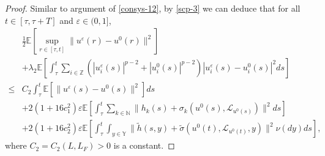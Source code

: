 \documentclass[11pt]{article}
\numberwithin{equation}{section}
\theoremstyle{plain}
\begin{document}
\begin{proof}
  Similar to argument of \eqref{consys-12},
  by \eqref{scp-3} we can deduce that for all $t \in [\tau, \tau+T]$ and $\varepsilon \in (0,1]$,
  \begin{align}\label{scp-4}
         & \frac{1}{2} \mathbb{E} \left[ \sup_{r \in [\tau, t]} \| u^\varepsilon(r) - u^0(r) \|^2 \right]  \nonumber\\
         & + \lambda_2 \mathbb{E}
              \left[ \int_{\tau}^{t}
                        \sum_{i \in \mathbb{Z}}
                          \left( |u^\varepsilon_i(s)|^{p-2} + |u^0_i(s)|^{p-2}
                          \right) |u^\varepsilon_i(s) - u^0_i(s)|^2 ds
              \right]  \nonumber\\
 \le & C_2 \int_{\tau}^{t}
                            \mathbb{E} \left[ \|u^\varepsilon(s) -  u^0(s)\|^2 \right] ds  \nonumber\\
        & + 2(1+16c_1^2) \varepsilon \mathbb{E}
                  \left[ \int_{\tau}^{t}
                               \sum_{k \in \mathbb{N} }
                                     \| h_k(s) + \sigma_k(u^{0}(s), \mathcal{L}_{u^{0}(s)}) \|^2 ds
                  \right]  \nonumber\\
        & + 2(1+16c_2^2) \varepsilon \mathbb{E}
                \left[ \int_{\tau}^{t}
                             \int_{y \in \mathbb{Y} }
                                                      \| \widetilde{h}(s,y) 
                                                         + \widetilde{\sigma}(u^0(t), \mathcal{L}_{u^0(t)}, y)
                                                      \|^2 \nu(dy) ds
                \right],
  \end{align}
  where $ {C}_2 =C_2 (L, L_F)>0$ is a constant.
 

\end{proof}
\end{document}
